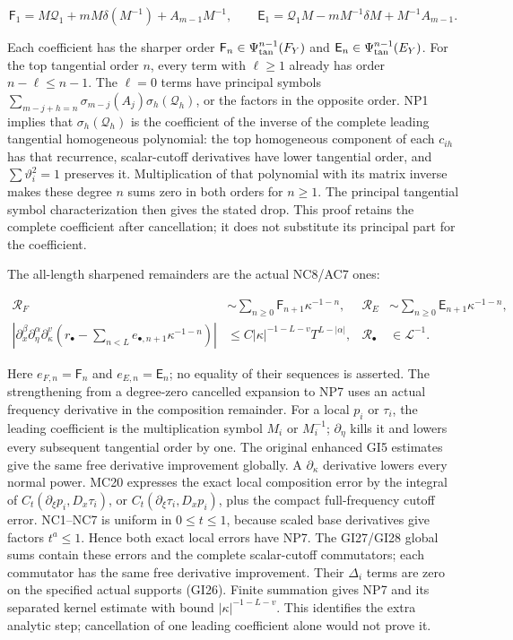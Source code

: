 \documentclass[
  11pt,
]{article}
\begin{document}
\[
 \mathsf F_1=M\mathcal Q_1+mM\delta(M^{-1})+A_{m-1}M^{-1},
 \qquad
 \mathsf E_1=\mathcal Q_1M-mM^{-1}\delta M+M^{-1}A_{m-1}.
 \tag{NP6}
\]

Each coefficient has the sharper order
\(\mathsf F _n\in \Psi _{\rm tan}^{n-1}(F_Y)\) and
\(\mathsf E _n\in \Psi _{\rm tan}^{n-1}(E_Y)\). For the top tangential
order \(n\), every term with \(\ell \ge 1\) already has order
\(n-\ell \le n-1\). The \(\ell =0\) terms have principal symbols
\(\sum _{m-j+h=n}\sigma _{m-j}(A_j)\sigma _h(\mathcal Q _h)\), or the
factors in the opposite order. NP1 implies that
\(\sigma _h(\mathcal Q _h)\) is the coefficient of the inverse of the
complete leading tangential homogeneous polynomial: the top homogeneous
component of each \(c_{ih}\) has that recurrence, scalar-cutoff
derivatives have lower tangential order, and \(\sum \vartheta _i^2=1\)
preserves it. Multiplication of that polynomial with its matrix inverse
makes these degree \(n\) sums zero in both orders for \(n\ge1\). The
principal tangential symbol characterization then gives the stated drop.
This proof retains the complete coefficient after cancellation; it does
not substitute its principal part for the coefficient.

The all-length sharpened remainders are the actual NC8/AC7 ones:

\[
 \begin{aligned}
 \mathcal R_F&\sim\sum_{n\ge0}\mathsf F_{n+1}\kappa^{-1-n},
 &\mathcal R_E&\sim\sum_{n\ge0}\mathsf E_{n+1}\kappa^{-1-n},\\
 \left|\partial_x^\beta\partial_\eta^\alpha\partial_\kappa^v
  \left(r_\bullet-\sum_{n<L}e_{\bullet,n+1}\kappa^{-1-n}\right)\right|
 &\le C|\kappa|^{-1-L-v}T^{L-|\alpha|},
 &\mathcal R_\bullet&\in\mathcal L^{-1}.
 \end{aligned}
 \tag{NP7}
\]

Here \(e_{F,n}=\mathsf F _n\) and \(e_{E,n}=\mathsf E _n\); no equality
of their sequences is asserted. The strengthening from a degree-zero
cancelled expansion to NP7 uses an actual frequency derivative in the
composition remainder. For a local \(p_i\) or \(\tau _i\), the leading
coefficient is the multiplication symbol \(M_i\) or \(M_i^{-1}\);
\(\partial _\eta \) kills it and lowers every subsequent tangential order
by one. The original enhanced GI5 estimates give the same free
derivative improvement globally. A \(\partial _\kappa \) derivative
lowers every normal power. MC20 expresses the exact local composition
error by the integral of \(C_t(\partial _{\xi}p_i,D_x\tau _i)\), or
\(C_t(\partial _{\xi}\tau _i,D_xp_i)\), plus the compact full-frequency
cutoff error. NC1--NC7 is uniform in \(0\le t\le1\), because scaled base
derivatives give factors \(t^a\le1\). Hence both exact local errors have
NP7. The GI27/GI28 global sums contain these errors and the complete
scalar-cutoff commutators; each commutator has the same free derivative
improvement. Their \(\Delta _i\) terms are zero on the specified actual
supports (GI26). Finite summation gives NP7 and its separated kernel
estimate with bound \(|\kappa |^{-1-L-v}\). This identifies the extra
analytic step; cancellation of one leading coefficient alone would not
prove it.
\end{document}
